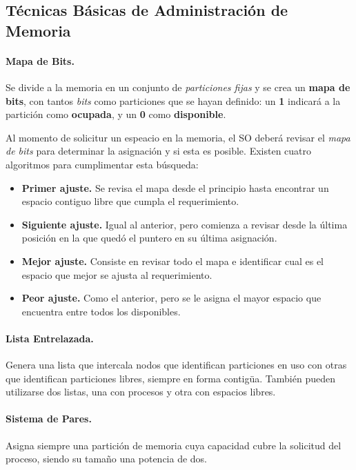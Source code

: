 \documentclass[10pt,a4paper]{article}
\begin{document}
\subsection{Técnicas Básicas de Administración de Memoria}

\paragraph{Mapa de Bits.} Se divide a la memoria en un conjunto de \textit{particiones fijas} y se crea un \textbf{mapa de bits}, con tantos \textit{bits} como particiones que se hayan definido: un \textbf{1} indicará a la partición como \textbf{ocupada}, y un \textbf{0} como \textbf{disponible}.

Al momento de solicitur un espeacio en la memoria, el SO deberá revisar el \textit{mapa de bits} para determinar la asignación y si esta es posible. Existen cuatro algoritmos para cumplimentar esta búsqueda:
\begin{itemize}
\item \textbf{Primer ajuste.} Se revisa el mapa desde el principio hasta encontrar un espacio contiguo libre que cumpla el requerimiento.
\item \textbf{Siguiente ajuste.} Igual al anterior, pero comienza a revisar desde la última posición en la que quedó el puntero en su última asignación.
\item \textbf{Mejor ajuste.} Consiste en revisar todo el mapa e identificar cual es el espacio que mejor se ajusta al requerimiento.
\item \textbf{Peor ajuste.} Como el anterior, pero se le asigna el mayor espacio que encuentra entre todos los disponibles.
\end{itemize}

\paragraph{Lista Entrelazada.}  Genera una lista que intercala nodos que identifican particiones en uso con otras que identifican particiones libres, siempre en forma contigüa. También pueden utilizarse dos listas, una con procesos y otra con espacios libres.

\paragraph{Sistema de Pares.} Asigna siempre una partición de memoria cuya capacidad cubre la solicitud del proceso, siendo su tamaño una potencia de dos.
\end{document}
